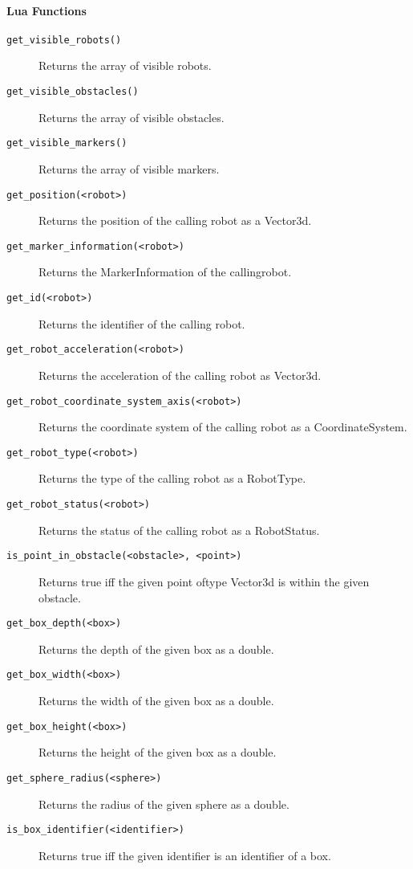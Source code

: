 \documentclass[a4paper,halfparskip,11pt,twoside]{scrartcl}
\begin{document}
\paragraph{Lua Functions}
\begin{description}
	\item [\texttt{get\_visible\_robots()}] Returns the array of visible robots.
	\item [\texttt{get\_visible\_obstacles()}] Returns the array of visible obstacles.
	\item [\texttt{get\_visible\_markers()}] Returns the array of visible markers.
	\item [\texttt{get\_position(<robot>)}] Returns the position of the calling robot as a Vector3d.
	\item [\texttt{get\_marker\_information(<robot>)}] Returns the MarkerInformation of the calling\linebreak robot.
	\item [\texttt{get\_id(<robot>)}] Returns the identifier of the calling robot.
	\item [\texttt{get\_robot\_acceleration(<robot>)}] Returns the acceleration of the calling robot as Vector3d.
	\item [\texttt{get\_robot\_coordinate\_system\_axis(<robot>)}] Returns the coordinate system of the calling robot as a CoordinateSystem.
	\item [\texttt{get\_robot\_type(<robot>)}] Returns the type of the calling robot as a RobotType.
	\item [\texttt{get\_robot\_status(<robot>)}] Returns the status of the calling robot as a RobotStatus.
	\item [\texttt{is\_point\_in\_obstacle(<obstacle>, <point>)}] Returns true iff the given point of\linebreak type Vector3d is within the given obstacle.
	\item [\texttt{get\_box\_depth(<box>)}] Returns the depth of the given box as a double.
	\item [\texttt{get\_box\_width(<box>)}] Returns the width of the given box as a double.
	\item [\texttt{get\_box\_height(<box>)}] Returns the height of the given box as a double.
	\item [\texttt{get\_sphere\_radius(<sphere>)}] Returns the radius of the given sphere as a double.
	\item [\texttt{is\_box\_identifier(<identifier>)}] Returns true iff the given identifier is an identifier of a box.

\end{description}
\end{document}
